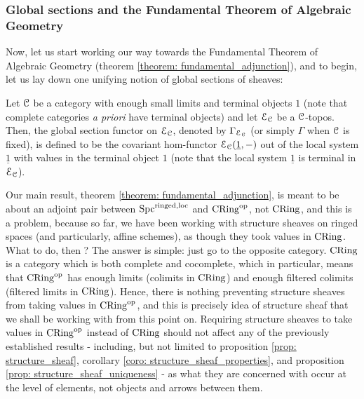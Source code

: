            \subsubsection{Global sections and the Fundamental Theorem of Algebraic Geometry} 
                Now, let us start working our way towards the Fundamental Theorem of Algebraic Geometry (theorem \ref{theorem: fundamental_adjunction}), and to begin, let us lay down one unifying notion of global sections of sheaves:
                \begin{definition} 
                    Let $\mathcal{C}$ be a category with enough small limits and terminal objects $1$ (note that complete categories \textit{a priori} have terminal objects) and let $\mathcal{E}_{\mathcal{C}}$ be a $\mathcal{C}$-topos. Then, the global section functor on $\mathcal{E}_{\mathcal{C}}$, denoted by $\Gamma_{\mathcal{E}_{\mathcal{C}}}$ (or simply $\Gamma$ when $\mathcal{C}$ is fixed), is defined to be the covariant hom-functor $\mathcal{E}_{\mathcal{C}}(\underline{1}, -)$ out of the local system $\underline{1}$ with values in the terminal object $1$ (note that the local system $\underline{1}$ is terminal in $\mathcal{E}_{\mathcal{C}}$). 
                \end{definition}
                
                \begin{remark} 
                    Our main result, theorem \ref{theorem: fundamental_adjunction}, is meant to be about an adjoint pair between $\mathrm{Spc}^{\mathrm{ringed}, \mathrm{loc}}$ and $\mathrm{CRing}^{\mathrm{op}}$, not $\mathrm{CRing}$, and this is a problem, because so far, we have been working with structure sheaves on ringed spaces (and particularly, affine schemes), as though they took values in $\mathrm{CRing}$. What to do, then ? The answer is simple: just go to the opposite category. $\mathrm{CRing}$ is a category which is both complete and cocomplete, which in particular, means that $\mathrm{CRing}^{\mathrm{op}}$ has enough limits (colimits in $\mathrm{CRing}$) and enough filtered colimits (filtered limits in $\mathrm{CRing}$). Hence, there is nothing preventing structure sheaves from taking values in $\mathrm{CRing}^{\mathrm{op}}$, and this is precisely idea of structure sheaf that we shall be working with from this point on. Requiring structure sheaves to take values in $\mathrm{CRing}^{\mathrm{op}}$ instead of $\mathrm{CRing}$ should not affect any of the previously established results - including, but not limited to proposition \ref{prop: structure_sheaf}, corollary \ref{coro: structure_sheaf_properties}, and proposition \ref{prop: structure_sheaf_uniqueness} - as what they are concerned with occur at the level of elements, not objects and arrows between them. 
                \end{remark}
                
